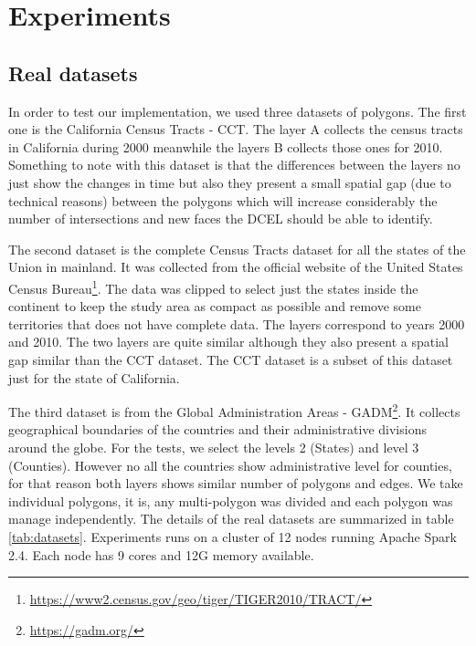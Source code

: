 \section{Experiments}

\subsection{Real datasets}
In order to test our implementation, we used three datasets of polygons.  The first one is the California Census Tracts - CCT. The layer A collects the census tracts in California during 2000 meanwhile the layers B collects those ones for 2010.  Something to note with this dataset is that the differences between the layers no just show the changes in time but also they present a small spatial gap (due to technical reasons) between the polygons which will increase considerably the number of intersections and new faces the DCEL should be able to identify.

The second dataset is the complete Census Tracts dataset for all the states of the Union in mainland.  It was collected from the official website of the United States Census Bureau\footnote{\url{https://www2.census.gov/geo/tiger/TIGER2010/TRACT/}}.  The data was clipped to select just the states inside the continent to keep the study area as compact as possible and remove some territories that does not have complete data. The layers correspond to years 2000 and 2010. The two layers are quite similar although they also present a spatial gap similar than the CCT dataset.  The CCT dataset is a subset of this dataset just for the state of California.

The third dataset is from the Global Administration Areas - GADM\footnote{\url{https://gadm.org/}}. It collects geographical boundaries of the countries and their administrative divisions around the globe.  For the tests, we select the levels 2 (States) and level 3 (Counties).  However no all the countries show administrative level for counties, for that reason both layers shows similar number of polygons and edges. We take individual polygons, it is, any multi-polygon was divided and each polygon was manage independently. The details of the real datasets are summarized in table \ref{tab:datasets}.  Experiments runs on a cluster of 12 nodes running Apache Spark 2.4.  Each node has 9 cores and 12G memory available.

